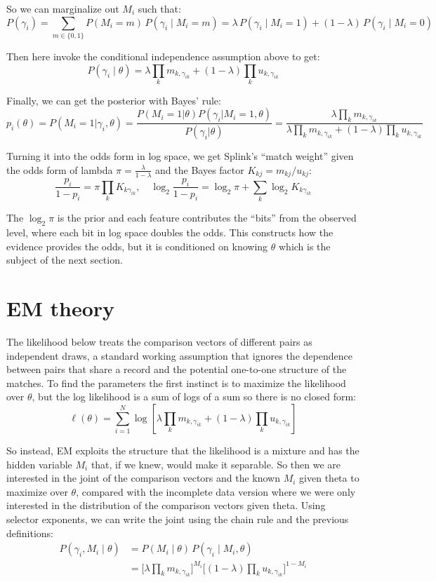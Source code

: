 \documentclass[11pt]{article}
\begin{document}
So we can marginalize out $M_i$ such that:
\[
P(\gamma_i) = \sum_{m \in \{0,1\}} P(M_i = m)\, P(\gamma_i \mid M_i = m)
= \lambda\, P(\gamma_i \mid M_i = 1) + (1 - \lambda)\, P(\gamma_i \mid M_i = 0)
\]

Then here invoke the conditional independence assumption above to get:
\[
P(\gamma_i \mid \theta) = \lambda \prod_k m_{k,\gamma_{ik}} + (1-\lambda) \prod_k u_{k,\gamma_{ik}}
\]

Finally, we can get the posterior with Bayes' rule:
\[
p_i(\theta) = P(M_i = 1 | \gamma_i, \theta) =  \frac{P(M_i = 1 | \theta)P(\gamma_i | M_i = 1, \theta)}{P(\gamma_i | \theta)}
= \frac{\lambda \prod_k m_{k,\gamma_{ik}}}{\lambda \prod_k m_{k,\gamma_{ik}} + (1-\lambda) \prod_k u_{k,\gamma_{ik}}}
\]

Turning it into the odds form in log space, we get Splink's ``match weight'' given the odds form of lambda $\pi = \frac{\lambda}{1 - \lambda}$ and the Bayes factor $K_{kj} = m_{kj}/u_{kj}$:
\[
\frac{p_i}{1-p_i} = \pi \prod_k K_{k\gamma_{ik}}, \quad \log_2 \frac{p_i}{1-p_i} = \log_2 \pi + \sum_k \log_2 K_{k\gamma_{ik}}
\]

The $\log_2 \pi$ is the prior and each feature contributes the ``bits'' from the observed level, where each bit in log space doubles the odds. This constructs how the evidence provides the odds, but it is conditioned on knowing $\theta$ which is the subject of the next section.

\section{EM theory}

The likelihood below treats the comparison vectors of different pairs as independent draws, a standard working assumption that ignores the dependence between pairs that share a record and the potential one-to-one structure of the matches. To find the parameters the first instinct is to maximize the likelihood over $\theta$, but the log likelihood is a sum of logs of a sum so there is no closed form:
\[
\ell(\theta) = \sum_{i=1}^{N} \log \left[ \lambda \prod_{k} m_{k,\gamma_{ik}} + (1-\lambda) \prod_{k} u_{k,\gamma_{ik}} \right]
\]

So instead, EM exploits the structure that the likelihood is a mixture and has the hidden variable $M_i$ that, if we knew, would make it separable. So then we are interested in the joint of the comparison vectors and the known $M_i$ given theta to maximize over $\theta$, compared with the incomplete data version where we were only interested in the distribution of the comparison vectors given theta. Using selector exponents, we can write the joint using the chain rule and the previous definitions:
\[
\begin{aligned}
P(\gamma_i, M_i \mid \theta) &= P(M_i \mid \theta)\, P(\gamma_i \mid M_i, \theta) \\
&= \Big[ \lambda \prod_{k} m_{k,\gamma_{ik}} \Big]^{M_i} \Big[ (1-\lambda) \prod_{k} u_{k,\gamma_{ik}} \Big]^{1-M_i}
\end{aligned}
\]
\end{document}
